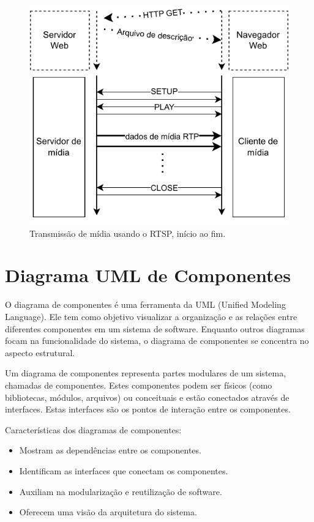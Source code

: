 \documentclass[12pt, %
openright, 
oneside, %
a4paper,    %
brazil]{facom-ufu-abntex2}
\begin{document}
\begin{figure}[!ht]
	\centering
	\includegraphics[width=0.8\linewidth]{rtsp.pdf}
	\caption[Diagrama RTSP]{Transmissão de mídia usando o RTSP, início ao fim. }

	\label{fig:rtspDiagram}
\end{figure}

\section{Diagrama UML de Componentes}

O diagrama de componentes é uma ferramenta da UML (Unified Modeling Language).
Ele tem como objetivo visualizar a organização e as relações entre diferentes
componentes em um sistema de software. Enquanto outros diagramas focam na
funcionalidade do sistema, o diagrama de componentes se concentra no aspecto
estrutural.

Um diagrama de componentes representa partes modulares de um sistema, chamadas
de componentes. Estes componentes podem ser físicos (como bibliotecas, módulos,
arquivos) ou conceituais e estão conectados através de interfaces. Estas
interfaces são os pontos de interação entre os componentes.

Características dos diagramas de componentes:
\begin{itemize}
	\item Mostram as dependências entre os componentes.
	\item Identificam as interfaces que conectam os componentes.
	\item Auxiliam na modularização e reutilização de software.
	\item Oferecem uma visão da arquitetura do sistema.
\end{itemize}
\end{document}

